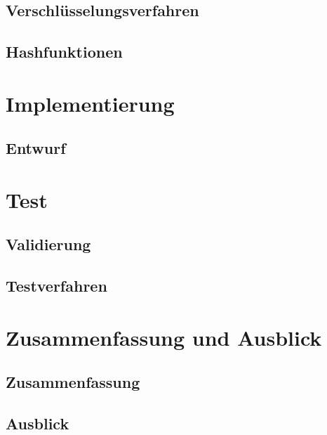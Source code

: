 \documentclass[10pt, a4paper]{scrreprt}
\begin{document}
\chapter{Verschlüsselungsverfahren}
\chapter{Hashfunktionen}

\part{Implementierung}
\chapter{Entwurf}

\part{Test}
\chapter{Validierung}
\chapter{Testverfahren}

\part{Zusammenfassung und Ausblick}
\chapter{Zusammenfassung}
\chapter{Ausblick}

\end{document}
